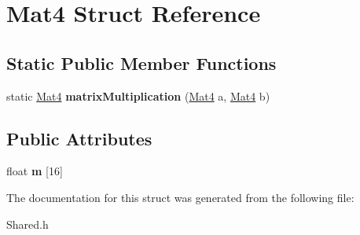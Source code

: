 \hypertarget{structMat4}{
\section{Mat4 Struct Reference}
\label{structMat4}
}
\subsection*{Static Public Member Functions}
\begin{DoxyCompactItemize}
\item 
\hypertarget{structMat4_ab29a68f1742b080d5ca1a60f47dfaf83}{
static \hyperlink{structMat4}{Mat4} {\bfseries matrixMultiplication} (\hyperlink{structMat4}{Mat4} a, \hyperlink{structMat4}{Mat4} b)}
\label{structMat4_ab29a68f1742b080d5ca1a60f47dfaf83}

\end{DoxyCompactItemize}
\subsection*{Public Attributes}
\begin{DoxyCompactItemize}
\item 
\hypertarget{structMat4_ad475f9d364516e86058ed2784530a05d}{
float {\bfseries m} \mbox{[}16\mbox{]}}
\label{structMat4_ad475f9d364516e86058ed2784530a05d}

\end{DoxyCompactItemize}


The documentation for this struct was generated from the following file:\begin{DoxyCompactItemize}
\item 
Shared.h\end{DoxyCompactItemize}
